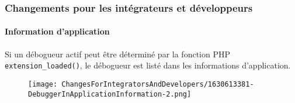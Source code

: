 %

\begin{frame}[fragile]
	\frametitle{Changements pour les intégrateurs et développeurs}
	\framesubtitle{Information d'application}

	Si un débogueur actif peut être déterminé par la fonction PHP
	\texttt{extension\_loaded()}, le débogueur est listé dans les informations d'application.

	\begin{figure}
		\texttt{[image: ChangesForIntegratorsAndDevelopers/1630613381-DebuggerInApplicationInformation-2.png]}
	\end{figure}

\end{frame}

